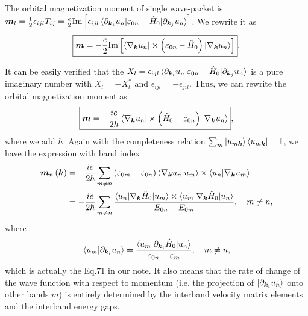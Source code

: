 \documentclass[12pt, oneside]{article}
\newcommand{\pa}{\partial}
\newcommand{\mr}[1]{\mathrm{#1}}
\newcommand{\p}[1]{\left(#1\right)}
\newcommand{\bb}[1]{\left[#1\right]}
\numberwithin{equation}{subsection}
\begin{document}
The orbital magnetization moment of single wave-packet is \(\bm{m}_l = \frac12 \epsilon_{ijl} T_{ij} = \frac{e}{2} \mr{Im} \bb{\epsilon_{ijl} \braket{\pa_{\bm{k}_i} u_n |  \varepsilon_{0 n} - \hat{H}_0  | \pa_{\bm{k}_j} u_n}} \). We rewrite it as 
\begin{align}
	\begin{split}
		\boxed{\bm{m} = - \frac{e}{2} \mr{Im} \bb{\braket{\nabla_{\bm{k}} u_n |  \times \p{ \varepsilon_{0 n} - \hat{H}_0 } | \nabla_{\bm{k}} u_n}}}.
	\end{split}
\end{align}

It can be easily verified that the \(X_{l} = \epsilon_{ijl} \braket{\pa_{\bm{k}_i} u_n |  \varepsilon_{0 n} - \hat{H}_0  | \pa_{\bm{k}_j} u_n}\) is a pure imaginary number with \(X_{l} = - X_{l}^{*}\) and \(\epsilon_{ijl} = - \epsilon_{jil}\). Thus, we can rewrite the orbital magnetization moment as 
\begin{align}
	\boxed{\bm{m} = - \frac{i e}{2 \hbar} \braket{\nabla_{\bm{k}} u_n |  \times \p{ \hat{H}_0 - \varepsilon_{0 n}} | \nabla_{\bm{k}} u_n}},
\end{align}
where we add \(\hbar\). Again with the completeness relation \(\sum_{m} \ket{u_{m \bm{k}}} \bra{u_{m \bm{k}}} = \mathbb{I}\), we have the expression with band index
\begin{align}
	\begin{split}
		\bm{m}_{n} \p{\bm{k}} & = - \frac{i e}{2 \hbar}  \sum_{m \neq n}  \p{ \varepsilon_{0 m} - \varepsilon_{0n} } \braket{\nabla_{\bm{k}} u_n | u_{m}} \times  \braket{u_{n} | \nabla_{\bm{k}} u_m} \\
		& = - \frac{i e}{2 \hbar} \sum_{m \neq n} \frac{ \braket{u_n| \nabla_{\bm{k}} \hat H_0|u_m} \times \braket{u_m | \nabla_{\bm{k}} \hat H_0|u_n}}{E_{0n} - E_{0m}}, \quad m\neq n,
	\end{split}
\end{align}
where 
\begin{align}
	\braket{u_m|\partial_{\bm{k}_i}u_n} = \frac{ \braket{u_m|\partial_{\bm{k}_i} \hat H_0|u_n} }{\varepsilon_{0n} - \varepsilon_{m}}, \quad m\neq n,
\end{align}
which is actually the Eq.71 in our note. It also means that the rate of change of the wave function with respect to momentum (i.e. the projection of  \(\ket{\pa_{\bm{k}_i} u_{n}}\) onto other bands \(m\)) is entirely determined by the interband velocity matrix elements and the interband energy gaps.
\end{document}
